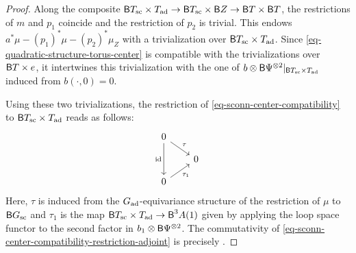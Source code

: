 \documentclass[10pt,english,reqno]{amsart}
\newcommand{\id}{\mathrm{id}}
\newcommand{\deloop}{\textnormal{\textsf{B}}}
\newcommand{\sconn}{\textnormal{sc}}
\newcommand{\adjoint}{\textnormal{ad}}
\theoremstyle{definition}
\numberwithin{equation}{section}
\begin{document}
\begin{proof}
Along the composite $\deloop T_{\sconn} \times T_{\adjoint} \rightarrow \deloop T_{\sconn} \times \deloop Z \rightarrow \deloop T \times \deloop T$, the restrictions of $m$ and $p_1$ coincide and the restriction of $p_2$ is trivial. This endows $a^*\mu - (p_1)^*\mu - (p_2)^*\mu_Z$ with a trivialization over $\deloop T_{\sconn} \times T_{\adjoint}$. Since \eqref{eq-quadratic-structure-torus-center} is compatible with the trivializations over $\deloop T\times e$, it intertwines this trivialization with the one of $b\otimes \deloop\Psi^{\otimes 2}|_{\deloop T_{\sconn} \times T_{\adjoint}}$ induced from $b(\cdot, 0) = 0$.

Using these two trivializations, the restriction of \eqref{eq-sconn-center-compatibility} to $\deloop T_{\sconn} \times T_{\adjoint}$ reads as follows:
\begin{equation}
\label{eq-sconn-center-compatibility-restriction-adjoint}
\begin{tikzcd}[column sep = 2em, row sep = 1em]
	0 \ar[dr, "\tau"]\ar[dd, swap, "\id"] & \\
	& 0 \\
	0 \ar[ur, swap, "\tau_1"]
\end{tikzcd}
\end{equation}
Here, $\tau$ is induced from the $G_{\adjoint}$-equivariance structure of the restriction of $\mu$ to $\deloop G_{\sconn}$ and $\tau_1$ is the map $\deloop T_{\sconn} \times T_{\adjoint} \rightarrow \deloop^3A(1)$ given by applying the loop space functor to the second factor in $b_1\otimes \deloop\Psi^{\otimes 2}$. The commutativity of \eqref{eq-sconn-center-compatibility-restriction-adjoint} is precisely \cite[Proposition 5.5.4]{zhao2022metaplectic}.
\end{proof}

\end{document}
